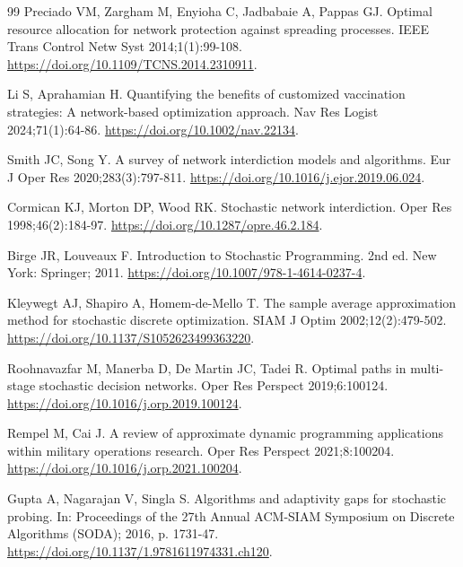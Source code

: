 \documentclass[preprint,11pt]{elsarticle}
\theoremstyle{definition}
\theoremstyle{remark}
\begin{document}
\begin{thebibliography}{99}
Preciado VM, Zargham M, Enyioha C, Jadbabaie A, Pappas GJ. Optimal resource allocation for network protection against spreading processes. IEEE Trans Control Netw Syst 2014;1(1):99-108. \url{https://doi.org/10.1109/TCNS.2014.2310911}.

Li S, Aprahamian H. Quantifying the benefits of customized vaccination strategies: A network-based optimization approach. Nav Res Logist 2024;71(1):64-86. \url{https://doi.org/10.1002/nav.22134}.

Smith JC, Song Y. A survey of network interdiction models and algorithms. Eur J Oper Res 2020;283(3):797-811. \url{https://doi.org/10.1016/j.ejor.2019.06.024}.

Cormican KJ, Morton DP, Wood RK. Stochastic network interdiction. Oper Res 1998;46(2):184-97. \url{https://doi.org/10.1287/opre.46.2.184}.

Birge JR, Louveaux F. Introduction to Stochastic Programming. 2nd ed. New York: Springer; 2011. \url{https://doi.org/10.1007/978-1-4614-0237-4}.

Kleywegt AJ, Shapiro A, Homem-de-Mello T. The sample average approximation method for stochastic discrete optimization. SIAM J Optim 2002;12(2):479-502. \url{https://doi.org/10.1137/S1052623499363220}.

Roohnavazfar M, Manerba D, De Martin JC, Tadei R. Optimal paths in multi-stage stochastic decision networks. Oper Res Perspect 2019;6:100124. \url{https://doi.org/10.1016/j.orp.2019.100124}.

Rempel M, Cai J. A review of approximate dynamic programming applications within military operations research. Oper Res Perspect 2021;8:100204. \url{https://doi.org/10.1016/j.orp.2021.100204}.

Gupta A, Nagarajan V, Singla S. Algorithms and adaptivity gaps for stochastic probing. In: Proceedings of the 27th Annual ACM-SIAM Symposium on Discrete Algorithms (SODA); 2016, p. 1731-47. \url{https://doi.org/10.1137/1.9781611974331.ch120}.


\end{thebibliography}
\end{document}
